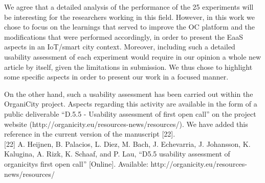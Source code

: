 \documentclass[letterpaper]{article}
\begin{document}
	{
		We agree that a detailed analysis of the performance of the 25 experiments will be interesting for the researchers working in this field. However, in this work we chose to focus on the learnings that served to improve the OC platform and the modifications that were performed accordingly, in order to present the EaaS aspects in an IoT/smart city context. Moreover, including such a detailed usability assessment of each experiment would require in our opinion a whole new article by itself, given the limitations in submission. We thus chose to highlight some specific aspects in order to present our work in a focused manner.
        
        On the other hand, such a usability assessment has been carried out within the OrganiCity project. Aspects regarding this activity are available in the form of a public deliverable ``D.5.5 - Usability assessment of first open call'' on the project website (http://organicity.eu/resources-news/resources/). We have added this reference in the current version of the manuscript [22].\\
        
     \small{[22] A. Heijnen, B. Palacios, L. Diez, M. Bach, J. Echevarria, J. Johansson,
K. Kalugina, A. Rizk, K. Schaaf, and P. Lau, ``D5.5 usability
assessment of organicitys first open call'' [Online]. Available:
http://organicity.eu/resources-news/resources/ }\\   
		
		
	}			
\end{document}
